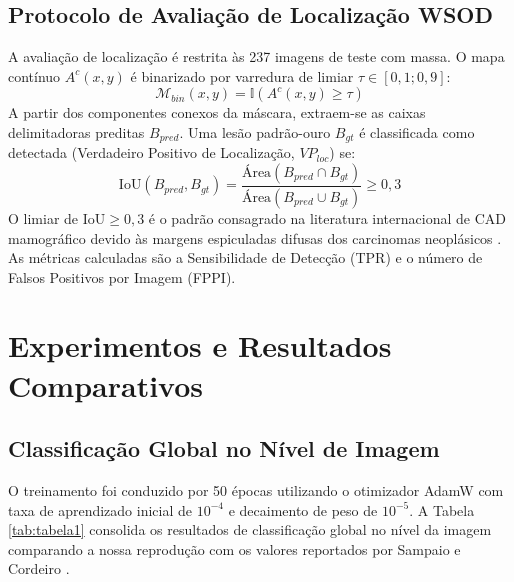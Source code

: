 \documentclass[12pt]{article}
\begin{document}
\subsection{Protocolo de Avaliação de Localização WSOD}

A avaliação de localização é restrita às 237 imagens de teste com massa. O mapa contínuo $A^c(x, y)$ é binarizado por varredura de limiar $\tau \in [0,1; 0,9]$:
\begin{equation}
\mathcal{M}_{bin}(x, y) = \mathbb{I}(A^c(x, y) \ge \tau)
\end{equation}
A partir dos componentes conexos da máscara, extraem-se as caixas delimitadoras preditas $B_{pred}$. Uma lesão padrão-ouro $B_{gt}$ é classificada como detectada (Verdadeiro Positivo de Localização, $VP_{loc}$) se:
\begin{equation}
\text{IoU}(B_{pred}, B_{gt}) = \frac{\text{Área}(B_{pred} \cap B_{gt})}{\text{Área}(B_{pred} \cup B_{gt})} \ge 0,3
\end{equation}
O limiar de $\text{IoU} \ge 0,3$ é o padrão consagrado na literatura internacional de CAD mamográfico devido às margens espiculadas difusas dos carcinomas neoplásicos \cite{shen2021interpretable}. As métricas calculadas são a Sensibilidade de Detecção (TPR) e o número de Falsos Positivos por Imagem (FPPI).

\section{Experimentos e Resultados Comparativos}

\subsection{Classificação Global no Nível de Imagem}

O treinamento foi conduzido por 50 épocas utilizando o otimizador AdamW com taxa de aprendizado inicial de $10^{-4}$ e decaimento de peso de $10^{-5}$. A Tabela \ref{tab:tabela1} consolida os resultados de classificação global no nível da imagem comparando a nossa reprodução com os valores reportados por Sampaio e Cordeiro \cite{sampaio2022study}.
\end{document}
